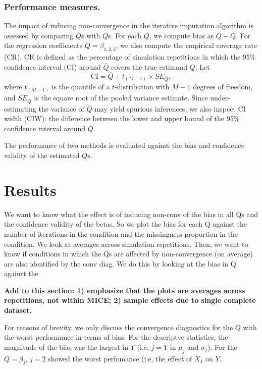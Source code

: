 \documentclass[Royal,times,sageh]{sagej}
\begin{document}
\hypertarget{performance-measures.}{%
\subsubsection{Performance measures.}\label{performance-measures.}}

The impact of inducing non-convergence in the iterative imputation
algorithm is assessed by comparing \(\bar{Q}\)s with \(Q\)s. For each
\(Q\), we compute bias as \(\bar{Q} - Q\). For the regression
coefficients \(Q=\beta_{1,2,3}\), we also compute the empirical coverage
rate (CR). CR is defined as the percentage of simulation repetitions in
which the 95\% confidence interval (CI) around \(\bar{Q}\) covers the
true estimand \(Q\). Let
\[\text{CI} = \bar{Q} \pm t_{(M-1)} \times SE_{\bar{Q}},\] where
\(t_{(M-1)}\) is the quantile of a \(t\)-distribution with \(M-1\)
degrees of freedom, and \(SE_{\bar{Q}}\) is the square root of the
pooled variance estimate. Since under-estimating the variance of
\(\bar{Q}\) may yield spurious inferences, we also inspect CI width
(CIW): the difference between the lower and upper bound of the 95\%
confidence interval around \(\bar{Q}\).

The performance of two methods is evaluated against the bias and
confidence validity of the estimated \(Q\)s.

\hypertarget{results}{%
\section{Results}\label{results}}

We want to know what the effect is of inducing non-conv of the bias in
all Qs and the confidence validity of the betas. So we plot the bias for
each Q against the number of iterations in the condition and the
missingness proportion in the condition. We look at averages across
simulation repetitions. Then, we want to know if conditions in which the
Qs are affected by non-convergence (on average) are also identified by
the conv diag. We do this by looking at the bias in Q against the

\textbf{Add to this section: 1) emphasize that the plots are averages
across repetitions, not within MICE; 2) sample effects due to single
complete dataset.}

For reasons of brevity, we only discuss the convergence diagnostics for
the \(Q\) with the worst performance in terms of bias. For the
descriptve statistics, the magnitude of the bias was the largest in
\(Y\) (i.e, \(j = Y\) in \(\mu_j\) and \(\sigma_j\)). For the
\(Q=\beta_j\), \(j=2\) showed the worst perfomance (i.e, the effect of
\(X_1\) on \(Y\).
\end{document}
